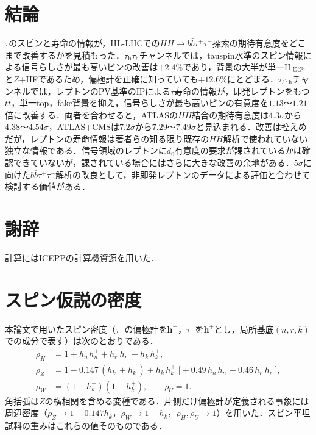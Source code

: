 \documentclass[paper=a4,fontsize=10pt,jafontsize=10pt,line_length=44zw,number_of_lines=46]{jlreq}
\newcommand{\tauh}{\tau_{\mathrm{h}}}
\newcommand{\taul}{\tau_{\ell}}
\newcommand{\bbtt}{b\bar b\tau^+\tau^-}
\newcommand{\hvec}{\boldsymbol{h}}
\begin{document}
\section{結論}\label{sec:concl}

$\tau$のスピンと寿命の情報が，HL-LHCでの$HH\to\bbtt$探索の期待有意度をどこまで改善するかを見積もった．$\tauh\tauh$チャンネルでは，tauspin水準のスピン情報による信号らしさが最も高いビンの改善は$+2.4\%$であり，背景の大半が単一Higgsと$Z$+HFであるため，偏極計を正確に知っていても$+12.6\%$にとどまる．$\taul\tauh$チャンネルでは，レプトンのPV基準のIPによる$\tau$寿命の情報が，即発レプトンをもつ$t\bar t$，単一top，fake背景を抑え，信号らしさが最も高いビンの有意度を$1.13$〜$1.21$倍に改善する．両者を合わせると，ATLASの$HH$結合の期待有意度は$4.3\sigma$から$4.38$〜$4.54\sigma$，ATLAS+CMSは$7.2\sigma$から$7.29$〜$7.49\sigma$と見込まれる．改善は控えめだが，レプトンの寿命情報は著者らの知る限り既存の$HH$解析で使われていない独立な情報である．信号領域のレプトンに$d_0$有意度の要求が課されているかは確認できていないが，課されている場合にはさらに大きな改善の余地がある．$5\sigma$に向けた$\bbtt$解析の改良として，非即発レプトンのデータによる評価と合わせて検討する価値がある．

\section*{謝辞}
計算にはICEPPの計算機資源を用いた．

\appendix
\section{スピン仮説の密度}\label{app:rho}

本論文で用いたスピン密度（$\tau^-$の偏極計を$\hvec^-$，$\tau^+$を$\hvec^+$とし，局所基底$(n,r,k)$での成分で表す）は次のとおりである．
\begin{align}
  \rho_H &= 1+h^-_nh^+_n+h^-_rh^+_r-h^-_kh^+_k, \\
  \rho_Z &= 1-0.147\,(h^-_k+h^+_k)+h^-_kh^+_k\;\bigl[+0.49\,h^-_nh^+_n-0.46\,h^-_rh^+_r\bigr], \\
  \rho_W &= (1-h^-_k)(1-h^+_k), \qquad \rho_U=1.
\end{align}
角括弧は$Z$の横相関を含める変種である．片側だけ偏極計が定義される事象には周辺密度（$\rho_Z\to1-0.147h_k$，$\rho_W\to1-h_k$，$\rho_H,\rho_U\to1$）を用いた．スピン平坦試料の重みはこれらの値そのものである．
\end{document}
